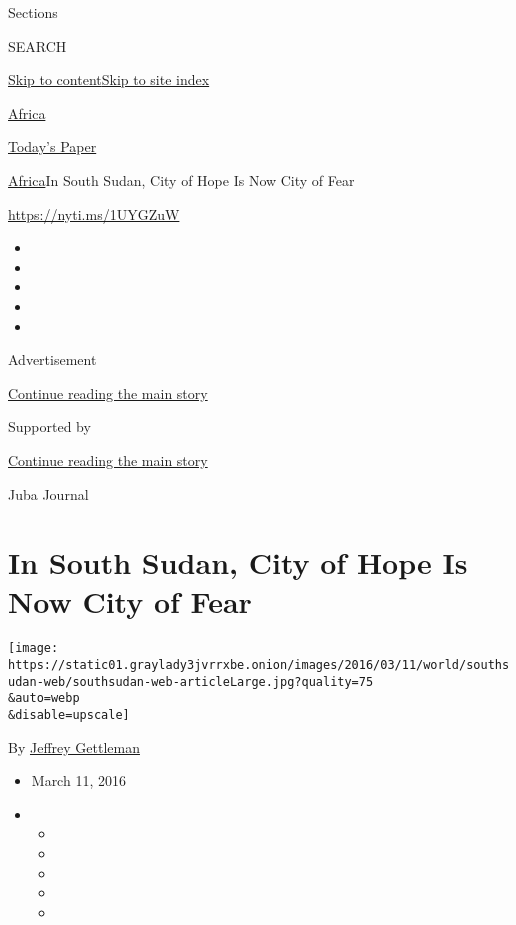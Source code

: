 Sections

SEARCH

\protect\hyperlink{site-content}{Skip to
content}\protect\hyperlink{site-index}{Skip to site index}

\href{https://www.nytimes3xbfgragh.onion/section/world/africa}{Africa}

\href{https://myaccount.nytimes3xbfgragh.onion/auth/login?response_type=cookie\&client_id=vi}{}

\href{https://www.nytimes3xbfgragh.onion/section/todayspaper}{Today's
Paper}

\href{/section/world/africa}{Africa}\textbar{}In South Sudan, City of
Hope Is Now City of Fear

\url{https://nyti.ms/1UYGZuW}

\begin{itemize}
\item
\item
\item
\item
\item
\end{itemize}

Advertisement

\protect\hyperlink{after-top}{Continue reading the main story}

Supported by

\protect\hyperlink{after-sponsor}{Continue reading the main story}

Juba Journal

\hypertarget{in-south-sudan-city-of-hope-is-now-city-of-fear}{%
\section{In South Sudan, City of Hope Is Now City of
Fear}\label{in-south-sudan-city-of-hope-is-now-city-of-fear}}

\texttt{[image: https://static01.graylady3jvrrxbe.onion/images/2016/03/11/world/southsudan-web/southsudan-web-articleLarge.jpg?quality=75\\\&auto=webp\\\&disable=upscale]}

By \href{http://www.nytimes3xbfgragh.onion/by/jeffrey-gettleman}{Jeffrey
Gettleman}

\begin{itemize}
\item
  March 11, 2016
\item
  \begin{itemize}
  \item
  \item
  \item
  \item
  \item
  \end{itemize}
\end{itemize}

